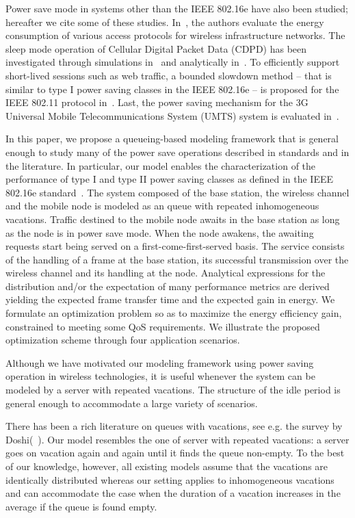 \documentclass[journal]{IEEEtran}
\begin{document}
Power save mode in systems other than the IEEE 802.16e have also been studied; hereafter we cite some of these studies. In~\cite{chen99}, the authors evaluate the energy consumption of various access protocols for wireless infrastructure networks. The sleep mode operation of Cellular Digital Packet Data (CDPD) has been investigated through simulations in~\cite{cdpd99} and analytically in~\cite{cdpd03}. To efficiently support short-lived sessions such as web traffic, a bounded slowdown method -- that is similar to type I
power saving classes in the IEEE 802.16e -- is proposed for the IEEE 802.11 protocol in~\cite{hari02}. Last, the power saving mechanism for the 3G Universal Mobile Telecommunications System (UMTS) system is evaluated in~\cite{yang05}. 

In this paper, we propose a queueing-based modeling framework that is general enough to study many of the power save operations described in standards and in the literature. In particular, our model enables the characterization of the performance of type I and type II power saving classes as defined in the IEEE 802.16e standard~\cite{man}. The system composed of the base station, the wireless channel and the
mobile node is modeled as an  queue with repeated inhomogeneous vacations. Traffic destined to the mobile node awaits in the base station as long as the node is in power save mode. When the node
awakens, the awaiting requests start being served on a first-come-first-served basis. The service consists of the handling of a frame at the base station, its successful transmission over the wireless channel and its handling at the node. Analytical expressions for the distribution and/or the expectation of many performance metrics are derived yielding the expected frame transfer time and the expected gain in energy. We formulate an optimization problem so as to maximize the energy efficiency gain, constrained to meeting some QoS requirements. We illustrate the proposed optimization scheme through four application scenarios.


Although we have motivated our modeling framework using power saving operation in wireless technologies, it is useful whenever the system can be modeled by a server with repeated vacations. The structure of the idle period is general enough to accommodate a large variety of scenarios. 

There has been a rich literature on queues with vacations, see e.g. the survey by Doshi(~\cite{Doshi}). Our model resembles the one of server with repeated vacations: a server goes on vacation again and again until it finds the queue non-empty. To the best of our knowledge, however, all existing models assume that the vacations are identically distributed whereas our setting applies to inhomogeneous vacations and can accommodate the case when the duration of a vacation increases in the average if the queue is found empty.
\end{document}
